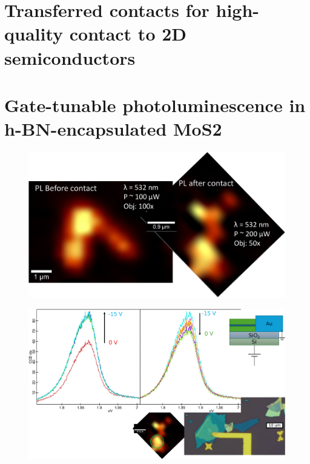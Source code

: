 \documentclass[double,12pt,1in]{beavtex}
\begin{document}
\chapter{Transferred contacts for high-quality contact to 2D semiconductors}

\chapter{Gate-tunable photoluminescence in h-BN-encapsulated MoS2}

\begin{figure}
    \includegraphics[width=1\textwidth]{PL before-after contact.pdf}
    \caption{}
\end{figure}

\begin{figure}
    \includegraphics[width=1\textwidth]{First Vg PL sweeps.pdf}
    \caption{}
\end{figure}
\end{document}
